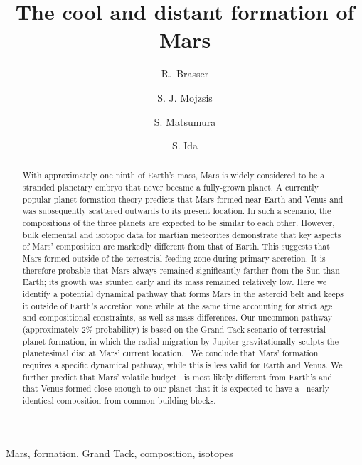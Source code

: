 \documentclass[preprint,5p,times,authoryear]{elsarticle}
\begin{document}
\begin{frontmatter}
\title{The cool and distant formation of Mars}
\author[elsi]{R.~Brasser}
\author[cu,has]{S. J. Mojzsis}
\author[dun]{S. Matsumura}
\author[elsi]{S. Ida}
\address[elsi]{Earth Life Science Institute, Tokyo Institute of Technology, Meguro-ku, Tokyo 152-8550, Japan}
\address[cu]{Department of Geological Sciences, University of Colorado, UCB 399, 2200 Colorado Avenue, Boulder, Colorado 80309-0399, 
USA}
\address[has]{Institute for Geological and Geochemical Research, Research Center for Astronomy and Earth Sciences, Hungarian 
Academy of Sciences, 45 Buda\"{o}rsi Street, H-1112 Budapest, Hungary}
\address[dun]{School of Science and Engineering, Division of Physics, Fulton Building, University of Dundee, Dundee 
DD1 4HN, UK}
\begin{abstract}
With approximately one ninth of Earth's mass, Mars is widely considered to be a stranded planetary embryo that never became a 
fully-grown planet. A currently popular planet formation theory predicts that Mars formed near Earth and Venus and was subsequently 
scattered outwards to its present location. In such a scenario, the compositions of the three planets are expected to be similar to 
each other. However, bulk elemental and isotopic data for martian meteorites demonstrate that key aspects of Mars' composition are 
markedly different from that of Earth. This suggests that Mars formed outside of the terrestrial feeding zone during primary accretion. 
It is therefore probable that Mars always remained significantly farther from the Sun than Earth; its growth was stunted early and its 
mass remained relatively low. Here we identify a potential dynamical pathway that forms Mars in the asteroid belt and keeps it outside 
of Earth's accretion zone while at the same time accounting for strict age and compositional constraints, as well as mass differences. 
Our uncommon pathway (approximately 2\% probability) is based on the Grand Tack scenario of terrestrial planet formation, in which the 
radial migration by Jupiter gravitationally sculpts the planetesimal disc at Mars' current location. {\ We conclude that Mars' 
formation requires a specific dynamical pathway, while this is less valid for Earth and Venus. We further predict that} Mars' volatile 
budget {\ is most likely} different from Earth's and that Venus formed close enough to our planet that it is expected to have a {\ 
nearly identical} composition from common building blocks.
\end{abstract}
\begin{keyword}
Mars, formation, Grand Tack, composition, isotopes
\end{keyword}
\end{frontmatter}
\end{document}

